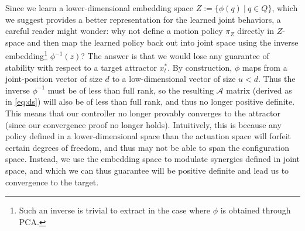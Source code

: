 \documentclass[letterpaper, 10 pt, conference,fleqn]{ieeeconf}
\begin{document}
Since we learn a lower-dimensional embedding space $Z := \{\phi(q) ~|~q \in Q\}$, which we suggest provides a better representation for the learned joint behaviors, a careful reader might wonder: why not define a motion policy $\pi_Z$ directly in $Z$-space and then map the learned policy back out into joint space using the inverse embedding\footnote{Such an inverse is trivial to extract in the case where $\phi$ is obtained through PCA.} $\phi^{-1}(z)$? The answer is that we would lose any guarantee of stability with respect to a target attractor $x_t^*$. By construction, $\phi$ maps from a joint-position vector of size $d$ to a low-dimensional vector of size $u<d$. Thus the inverse $\phi^{-1}$ must be of less than full rank, so the resulting $\mathcal{A}$ matrix (derived as in \eqref{eq:ds}) will also be of less than full rank, and thus no longer positive definite. This means that our controller no longer provably converges to the attractor (since our convergence proof no longer holds). Intuitively, this is because any policy defined in a lower-dimensional space than the actuation space will forfeit certain degrees of freedom, and thus may not be able to span the configuration space. Instead, we use the embedding space to modulate synergies defined in joint space, and which we can thus guarantee will be positive definite and lead us to convergence to the target.
\end{document}
